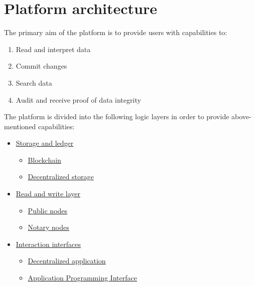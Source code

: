 \documentclass[12pt]{report}
\newcommand{\hlc}[1]{\colorbox{yellow!25}{#1}}
\begin{document}
\section{Platform architecture}
\label{tech-arch}
\begin{multicols}{2}
The primary aim of the platform is to provide users with capabilities to:
\begin{enumerate}
\item Read and interpret data
\item \hlc{Commit} changes
\item Search data
\item Audit and receive proof of data \hlc{integrity}
\end{enumerate}
The platform is divided into the following logic layers in order to provide above-mentioned capabilities:
\begin{itemize}
	\item \hyperref[tech-arch-underlayer]{Storage and \hlc{ledger}}
	\begin{itemize}
		\item \hyperref[tech-blockchain]{Blockchain}
		\item \hyperref[tech-storage]{Decentralized storage}
	\end{itemize}
	\item \hyperref[tech-arch-connect]{Read and write \hlc{layer}}
	\begin{itemize}
		\item \hyperref[tech-arch-connect-nodes]{Public nodes}
		\item \hyperref[tech-arch-connect-validators]{Notary nodes}
	\end{itemize}
	\item \hyperref[tech-arch-interfaces]{Interaction interfaces}
	\begin{itemize}
		\item \hyperref[tech-arch-interfaces-dapp]{Decentralized application}
		\item \hyperref[tech-arch-interfaces-api]{Application Programming Interface}
	\end{itemize}
\end{itemize}
\end{multicols}

\def\Interface{Interaction Interface}
\def\Connect{Access layer}
\def\Underlayer{Storage and ledger layer}

\def\DApps{Decentralized Applications}
\def\Api{API}
\def\Requests{Direct \hlc{requests}}
\end{document}
